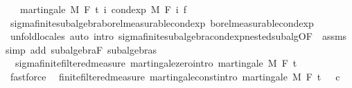 \begin{isabellebody}
\ \ \ {\isachardoublequoteopen}martingale\ M\ F\ t\ {\isacharparenleft}{\kern0pt}{\isasymlambda}i{\isachardot}{\kern0pt}\ cond{\isacharunderscore}{\kern0pt}exp\ M\ {\isacharparenleft}{\kern0pt}F\ i{\isacharparenright}{\kern0pt}\ f{\isacharparenright}{\kern0pt}{\isachardoublequoteclose}\isanewline
%
\isadelimproof
\ \ %
\endisadelimproof
%
\isatagproof
{}\isamarkupfalse%
\ sigma{\isacharunderscore}{\kern0pt}finite{\isacharunderscore}{\kern0pt}subalgebra{\isachardot}{\kern0pt}borel{\isacharunderscore}{\kern0pt}measurable{\isacharunderscore}{\kern0pt}cond{\isacharunderscore}{\kern0pt}exp{\isacharprime}{\kern0pt}\ borel{\isacharunderscore}{\kern0pt}measurable{\isacharunderscore}{\kern0pt}cond{\isacharunderscore}{\kern0pt}exp\ \isanewline
\ \ \isamarkupfalse%
\ {\isacharparenleft}{\kern0pt}unfold{\isacharunderscore}{\kern0pt}locales{\isacharparenright}{\kern0pt}\ {\isacharparenleft}{\kern0pt}auto\ intro{\isacharcolon}{\kern0pt}\ sigma{\isacharunderscore}{\kern0pt}finite{\isacharunderscore}{\kern0pt}subalgebra{\isachardot}{\kern0pt}cond{\isacharunderscore}{\kern0pt}exp{\isacharunderscore}{\kern0pt}nested{\isacharunderscore}{\kern0pt}subalg{\isacharbrackleft}{\kern0pt}OF\ {\isacharunderscore}{\kern0pt}\ assms{\isacharbrackright}{\kern0pt}\ simp\ add{\isacharcolon}{\kern0pt}\ subalgebra{\isacharunderscore}{\kern0pt}F\ subalgebras{\isacharparenright}{\kern0pt}%
\endisatagproof
{\isafoldproof}%
%
\isadelimproof
\isanewline
%
\endisadelimproof
\isanewline
{}\isamarkupfalse%
\ {\isacharparenleft}{\kern0pt}\ sigma{\isacharunderscore}{\kern0pt}finite{\isacharunderscore}{\kern0pt}filtered{\isacharunderscore}{\kern0pt}measure{\isacharparenright}{\kern0pt}\ martingale{\isacharunderscore}{\kern0pt}zero{\isacharbrackleft}{\kern0pt}intro{\isacharbrackright}{\kern0pt}{\isacharcolon}{\kern0pt}\ {\isachardoublequoteopen}martingale\ M\ F\ t\ {\isacharparenleft}{\kern0pt}{\isasymlambda}{\isacharunderscore}{\kern0pt}\ {\isacharunderscore}{\kern0pt}{\isachardot}{\kern0pt}\ {}{\isacharparenright}{\kern0pt}{\isachardoublequoteclose}%
\isadelimproof
\ %
\endisadelimproof
%
\isatagproof
{}\isamarkupfalse%
\ fastforce%
\endisatagproof
{\isafoldproof}%
%
\isadelimproof
%
\endisadelimproof
\isanewline
\isanewline
{}\isamarkupfalse%
\ {\isacharparenleft}{\kern0pt}\ finite{\isacharunderscore}{\kern0pt}filtered{\isacharunderscore}{\kern0pt}measure{\isacharparenright}{\kern0pt}\ martingale{\isacharunderscore}{\kern0pt}const{\isacharbrackleft}{\kern0pt}intro{\isacharbrackright}{\kern0pt}{\isacharcolon}{\kern0pt}\ {\isachardoublequoteopen}martingale\ M\ F\ t\ {\isacharparenleft}{\kern0pt}{\isasymlambda}{\isacharunderscore}{\kern0pt}\ {\isacharunderscore}{\kern0pt}{\isachardot}{\kern0pt}\ c{\isacharparenright}{\kern0pt}{\isachardoublequoteclose}%

\end{isabellebody}

